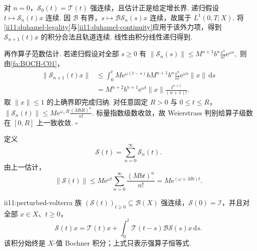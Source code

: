 \begin{FAProof}
对 \(\displaystyle n=0\)，\(\displaystyle\mathcal S_0(t)=\mathcal T(t)\) 强连续，且估计正是给定增长界. 递归假设 \(\displaystyle t\mapsto\mathcal S_n(t)x\) 连续. 因 \(\displaystyle\mathcal B\) 有界，\(\displaystyle s\mapsto\mathcal B\mathcal S_n(s)x\) 连续，故属于 \(\displaystyle L^1(0,T;X)\). 将\autoref{ii11:duhamel-legality}与\autoref{ii11:duhamel-continuity}应用于该外力项，得到 \(\displaystyle\mathcal S_{n+1}(t)x\) 的积分合法且轨道连续. 线性由积分线性递归得到.

再作算子范数估计. 若递归假设对全部 \(\displaystyle s\geqslant0\) 有 \(\displaystyle \|\mathcal S_n(s)\| \leqslant M^{n+1}b^n\frac{s^n}{n!}\mathrm{e}^{\omega s},\)
则由\autoref{fa:BOCH-C01}，
\[
\begin{aligned}
\displaystyle \|\mathcal S_{n+1}(t)x\|
&\displaystyle \leqslant
\int_0^t
M\mathrm{e}^{\omega(t-s)}b
M^{n+1}b^n\frac{s^n}{n!}\mathrm{e}^{\omega s}
\|x\|\,\mathrm{d}s\\[12pt]
&\displaystyle =
M^{n+2}b^{n+1}\mathrm{e}^{\omega t}\|x\|
\frac{t^{n+1}}{(n+1)!}.
\end{aligned}
\]
取 \(\displaystyle\|x\|\leqslant1\) 的上确界即完成归纳. 对任意固定 \(\displaystyle R>0\) 与 \(\displaystyle0\leqslant t\leqslant R\)， \(\displaystyle \|\mathcal S_n(t)\| \leqslant M\mathrm{e}^{\omega_+R} \frac{(MbR)^n}{n!}.\)
标量指数级数收敛，故 Weierstrass 判别给算子级数在 \(\displaystyle[0,R]\) 上一致收敛.
\hfill\(\square\)
\end{FAProof}

定义
\[
\mathcal S(t)
=
\sum_{n=0}^{\infty}\mathcal S_n(t).
\]
由上一估计，
\[
\|\mathcal S(t)\|\leqslant M\mathrm{e}^{\omega t}\sum_{n=0}^{\infty}\frac{(Mbt)^n}{n!}=M\mathrm{e}^{(\omega+Mb)t}.
\]

\begin{FAProposition}{ii11:perturbed-volterra}
族 \(\displaystyle(\mathcal S(t))_{t\geqslant0}\subseteq\mathcal B(X)\) 强连续，\(\displaystyle\mathcal S(0)=\mathcal I\)，并且对全部 \(\displaystyle x\in X\)、\(\displaystyle t\geqslant0\)，
\[
\mathcal S(t)x
=
\mathcal T(t)x
+
\int_0^t
\mathcal T(t-s)\mathcal B\mathcal S(s)x
\,\mathrm{d}s.
\]
该积分始终是 \(\displaystyle X\)-值 Bochner 积分；上式只表示强算子恒等式.
\end{FAProposition}

